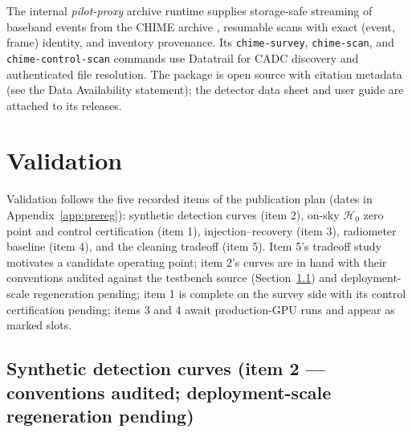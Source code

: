 The internal \textit{pilot-proxy} archive runtime supplies storage-safe
streaming of baseband events from the CHIME archive \citep[captured by the
system described in][]{michilli2021baseband}, resumable scans with exact
(event, frame) identity, and inventory provenance. Its
\texttt{chime-survey}, \texttt{chime-scan}, and
\texttt{chime-control-scan} commands use Datatrail for CADC discovery and
authenticated file resolution. The package is open source with citation
metadata (see the Data Availability statement); the detector data sheet and
user guide are attached to its releases.

\section{Validation}
\label{sec:validation}

Validation follows the five recorded items of the publication plan
(dates in Appendix~\ref{app:prereg}):
synthetic detection curves (item 2), on-sky $\mathcal{H}_0$ zero point and
control
certification (item 1), injection--recovery (item 3), radiometer baseline
(item 4), and the cleaning tradeoff (item 5). Item 5's tradeoff study
motivates a candidate operating point; item
2's curves are in hand with their conventions audited against the
testbench source (Section~\ref{sec:synthetic}) and deployment-scale
regeneration pending; item 1 is complete on the survey side with its
control certification pending; items 3 and 4 await production-GPU runs
and appear as marked slots.

\subsection{Synthetic detection curves (item 2 --- conventions audited; deployment-scale regeneration pending)}
\label{sec:synthetic}

